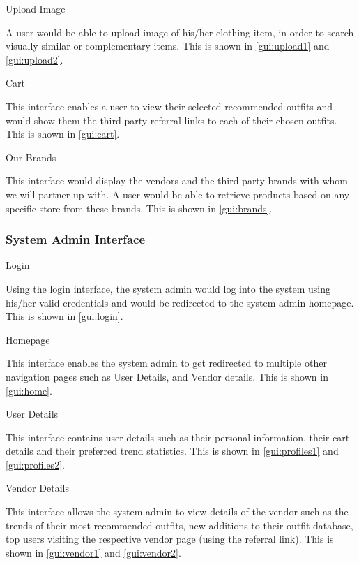 \begin{outline}
  
  
  \1 Upload Image
  
  A user would be able to upload image of his/her clothing item, in order to search visually similar or complementary items. This is shown in \autoref{gui:upload1} and \autoref{gui:upload2}.
  


  \1 Cart
  
  This interface enables a user to view their selected recommended outfits and would show them the third-party referral links to each of their chosen outfits. This is shown in \autoref{gui:cart}.
  

  \1 Our Brands

  This interface would display the vendors and the third-party brands with whom we will partner up with. A user would be able to retrieve products based on any specific store from these brands. This is shown in \autoref{gui:brands}. 
  
 \end{outline}
 
 \subsubsection{System Admin Interface}
 \begin{outline}
   \1 Login
   
   Using the login interface, the system admin would log into the system using his/her valid credentials and would be redirected to the system admin homepage. This is shown in \autoref{gui:login}.
   
   \1 Homepage
   
   This interface enables the system admin to get redirected to multiple other navigation pages such as User Details, and Vendor details. This is shown in \autoref{gui:home}.
   
   \1 User Details
   
   This interface contains user details such as their personal information, their cart details and their preferred trend statistics. This is shown in \autoref{gui:profiles1} and \autoref{gui:profiles2}.
   
   \1 Vendor Details
   
   This interface allows the system admin to view details of the vendor such as the trends of their most recommended outfits, new additions to their outfit database, top users visiting the respective vendor page (using the referral link). This is shown in \autoref{gui:vendor1} and \autoref{gui:vendor2}.
 \end{outline}

